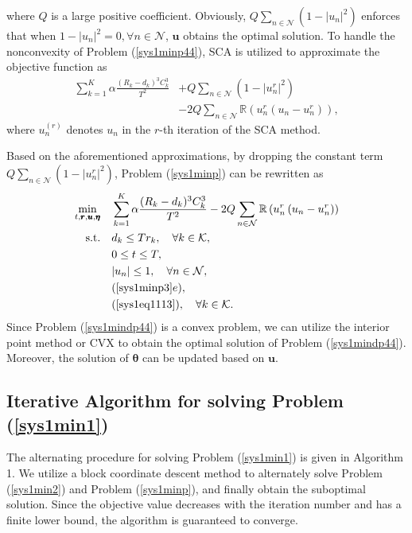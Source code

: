 \documentclass[journal]{IEEEtran}
\begin{document}
where $Q$ is a large positive coefficient. Obviously, $Q\sum_{n\in\mathcal N}\left(1-|u_n|^2\right)$ enforces that when $1-|u_n|^2=0, \forall n\in\mathcal N$, $\pmb u$ obtains the optimal solution.
To handle the nonconvexity of  Problem (\ref{sys1minp44}), SCA is utilized to approximate the objective function as
\begin{align}
\sum_{k=1}^K \alpha\frac{(R_{k}-d_{k})^3 C^3_{k}}{T^2}&+Q\sum_{n\in\mathcal N}\left(1-|u^{r}_n|^2\right)\\\nonumber
&-2Q\sum_{n\in\mathcal N}\mathbb{R}\left(u^{r}_n\left(u_n- u^{r}_n\right)\right),
\end{align}
where $ u_n^{(r)}$ denotes $u_n$ in the $r$-th iteration of the SCA method.

Based on the aforementioned approximations, by dropping the constant term $Q\sum_{n\in\mathcal N}\left(1-| u^{r}_n|^2\right)$, Problem (\ref{sys1minp}) can be rewritten as
\begin{subequations}\label{sys1mindp44}
	\begin{align}
	\mathop{\min}_{t, \pmb r, \pmb u, \pmb \eta}\quad
	&\sum_{k=1}^K \alpha\frac{(R_{k}-d_{k})^3 C^3_{k}}{T^2}-2Q\sum_{n\in\mathcal N}\mathbb{R}\left( u^{r}_n\left(u_n- u^{r}_n\right)\right)\\
	\textrm{s.t.}\quad
	& d_k\leq Tr_k, \quad \forall k\in\mathcal K,\\
	& 0\leq t \leq T,\\
	& |u_n|\leq 1, \quad \forall n\in\mathcal N,\\
	&(\ref{sys1minp3}e),\\
	&(\ref{sys1eq1113}), \quad \forall k\in\mathcal K.
	\end{align}
\end{subequations}
Since Problem (\ref{sys1mindp44}) is a convex problem, we can utilize the interior point method or CVX\cite{cvx} to obtain the optimal solution of Problem (\ref{sys1mindp44}). Moreover, the solution of $\pmb\theta$ can be updated based on $\pmb u$.


\subsection{Iterative Algorithm for solving Problem (\ref{sys1min1})}
The alternating procedure for solving Problem (\ref{sys1min1}) is given in Algorithm 1. We utilize a block coordinate descent method to alternately solve Problem (\ref{sys1min2}) and Problem (\ref{sys1minp}), and finally obtain the suboptimal solution.
Since the objective value decreases with the iteration number and has a finite lower bound, the algorithm is guaranteed to converge.
\end{document}
